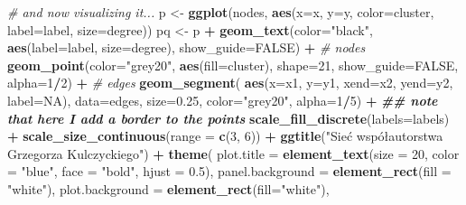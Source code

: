 \documentclass[
  12pt,
]{article}
\newenvironment{Shaded}{\begin{snugshade}}{\end{snugshade}}
\newcommand{\AttributeTok}[1]{\textcolor[rgb]{0.13,0.29,0.53}{#1}}
\newcommand{\CommentTok}[1]{\textcolor[rgb]{0.56,0.35,0.01}{\textit{#1}}}
\newcommand{\ConstantTok}[1]{\textcolor[rgb]{0.56,0.35,0.01}{#1}}
\newcommand{\DecValTok}[1]{\textcolor[rgb]{0.00,0.00,0.81}{#1}}
\newcommand{\DocumentationTok}[1]{\textcolor[rgb]{0.56,0.35,0.01}{\textbf{\textit{#1}}}}
\newcommand{\FloatTok}[1]{\textcolor[rgb]{0.00,0.00,0.81}{#1}}
\newcommand{\FunctionTok}[1]{\textcolor[rgb]{0.13,0.29,0.53}{\textbf{#1}}}
\newcommand{\NormalTok}[1]{#1}
\newcommand{\OtherTok}[1]{\textcolor[rgb]{0.56,0.35,0.01}{#1}}
\newcommand{\SpecialCharTok}[1]{\textcolor[rgb]{0.81,0.36,0.00}{\textbf{#1}}}
\newcommand{\StringTok}[1]{\textcolor[rgb]{0.31,0.60,0.02}{#1}}
\begin{document}
\begin{Shaded}
\begin{Highlighting}[]
\CommentTok{\# and now visualizing it...}
\NormalTok{p }\OtherTok{\textless{}{-}} \FunctionTok{ggplot}\NormalTok{(nodes, }\FunctionTok{aes}\NormalTok{(}\AttributeTok{x=}\NormalTok{x, }\AttributeTok{y=}\NormalTok{y, }\AttributeTok{color=}\NormalTok{cluster, }\AttributeTok{label=}\NormalTok{label, }\AttributeTok{size=}\NormalTok{degree))}
\NormalTok{pq }\OtherTok{\textless{}{-}}\NormalTok{ p }\SpecialCharTok{+} \FunctionTok{geom\_text}\NormalTok{(}\AttributeTok{color=}\StringTok{"black"}\NormalTok{, }\FunctionTok{aes}\NormalTok{(}\AttributeTok{label=}\NormalTok{label, }\AttributeTok{size=}\NormalTok{degree),}
                    \AttributeTok{show\_guide=}\ConstantTok{FALSE}\NormalTok{) }\SpecialCharTok{+}
  \CommentTok{\# nodes}
  \FunctionTok{geom\_point}\NormalTok{(}\AttributeTok{color=}\StringTok{"grey20"}\NormalTok{, }\FunctionTok{aes}\NormalTok{(}\AttributeTok{fill=}\NormalTok{cluster),}
             \AttributeTok{shape=}\DecValTok{21}\NormalTok{, }\AttributeTok{show\_guide=}\ConstantTok{FALSE}\NormalTok{, }\AttributeTok{alpha=}\DecValTok{1}\SpecialCharTok{/}\DecValTok{2}\NormalTok{) }\SpecialCharTok{+}
  \CommentTok{\# edges}
  \FunctionTok{geom\_segment}\NormalTok{(}
    \FunctionTok{aes}\NormalTok{(}\AttributeTok{x=}\NormalTok{x1, }\AttributeTok{y=}\NormalTok{y1, }\AttributeTok{xend=}\NormalTok{x2, }\AttributeTok{yend=}\NormalTok{y2, }\AttributeTok{label=}\ConstantTok{NA}\NormalTok{),}
    \AttributeTok{data=}\NormalTok{edges, }\AttributeTok{size=}\FloatTok{0.25}\NormalTok{, }\AttributeTok{color=}\StringTok{"grey20"}\NormalTok{, }\AttributeTok{alpha=}\DecValTok{1}\SpecialCharTok{/}\DecValTok{5}\NormalTok{) }\SpecialCharTok{+}
  \DocumentationTok{\#\# note that here I add a border to the points}
  \FunctionTok{scale\_fill\_discrete}\NormalTok{(}\AttributeTok{labels=}\NormalTok{labels) }\SpecialCharTok{+}
  \FunctionTok{scale\_size\_continuous}\NormalTok{(}\AttributeTok{range =} \FunctionTok{c}\NormalTok{(}\DecValTok{3}\NormalTok{, }\DecValTok{6}\NormalTok{)) }\SpecialCharTok{+}
  \FunctionTok{ggtitle}\NormalTok{(}\StringTok{"Sieć współautorstwa Grzegorza Kulczyckiego"}\NormalTok{) }\SpecialCharTok{+}
  \FunctionTok{theme}\NormalTok{(}
    \AttributeTok{plot.title =} \FunctionTok{element\_text}\NormalTok{(}\AttributeTok{size =} \DecValTok{20}\NormalTok{, }\AttributeTok{color =} \StringTok{"blue"}\NormalTok{, }\AttributeTok{face =} \StringTok{"bold"}\NormalTok{, }\AttributeTok{hjust =} \FloatTok{0.5}\NormalTok{),}
    \AttributeTok{panel.background =} \FunctionTok{element\_rect}\NormalTok{(}\AttributeTok{fill =} \StringTok{"white"}\NormalTok{),}
    \AttributeTok{plot.background =} \FunctionTok{element\_rect}\NormalTok{(}\AttributeTok{fill=}\StringTok{"white"}\NormalTok{),}

\end{Highlighting}
\end{Shaded}
\end{document}
